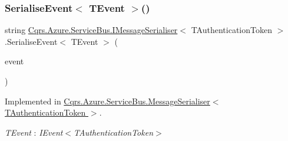 \subsubsection{\texorpdfstring{Serialise\+Event$<$ T\+Event $>$()}{SerialiseEvent< TEvent >()}}
{\footnotesize\ttfamily string \hyperlink{interfaceCqrs_1_1Azure_1_1ServiceBus_1_1IMessageSerialiser}{Cqrs.\+Azure.\+Service\+Bus.\+I\+Message\+Serialiser}$<$ T\+Authentication\+Token $>$.Serialise\+Event$<$ T\+Event $>$ (\begin{DoxyParamCaption}\item[{T\+Event @}]{event }\end{DoxyParamCaption})}



Implemented in \hyperlink{classCqrs_1_1Azure_1_1ServiceBus_1_1MessageSerialiser_a596224ec927c673958e72a2153931c09_a596224ec927c673958e72a2153931c09}{Cqrs.\+Azure.\+Service\+Bus.\+Message\+Serialiser$<$ T\+Authentication\+Token $>$}.

\begin{Desc}
\item[Type Constraints]\begin{description}
\item[{\em T\+Event} : {\em I\+Event$<$T\+Authentication\+Token$>$}]\end{description}
\end{Desc}
